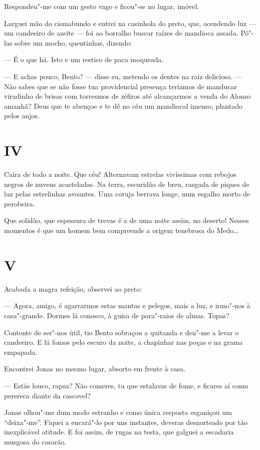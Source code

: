 Respondeu"-me com um gesto vago e ficou"-se no lugar, imóvel.

Larguei mão do cismabundo e entrei na casinhola do preto, que, acendendo
luz --- um candeeiro de azeite --- foi ao borralho buscar raízes de
mandioca assada. Pô"-las sobre um mocho, quentinhas, dizendo:

--- É o que há. Isto e um restico de paca moqueada.

--- E achas pouco, Bento? --- disse eu, metendo os dentes na raiz
deliciosa. --- Não sabes que se não fosse tua providencial presença
teríamos de manducar viradinho de brisas com torresmos de zéfiros até
alcançarmos a venda do Alonso amanhã? Deus que te abençoe e te dê no céu
um mandiocal imenso, plantado pelos anjos.

\section*{IV}

Caíra de todo a noite. Que céu! Alternavam estrelas vivíssimas com
rebojos negros de nuvens acasteladas. Na terra, escuridão de breu,
rasgada de piques de luz pelas estrelinhas avoantes. Uma coruja berrava
longe, num esgalho morto de perobeira.

Que solidão, que espessura de trevas é a de uma noite assim, no deserto!
Nesses momentos é que um homem bem compreende a origem tenebrosa do
Medo\ldots{}

\section*{V}

Acabada a magra refeição, observei ao preto:

--- Agora, amigo, é agarrarmos estas mantas e pelegos, mais a luz, e
irmo"-nos à casa"-grande. Dormes lá conosco, à guisa de para"-raios de
almas. Topas?

Contente de ser"-nos útil, tio Bento sobraçou a quitanda e deu"-me a levar
o candeeiro. E lá fomos pelo escuro da noite, a chapinhar nas poças e na
grama empapada.

Encontrei Jonas no mesmo lugar, absorto em frente à casa.

--- Estás louco, rapaz? Não comeres, tu que estalavas de fome, e ficares
aí como perereca diante da cascavel?

Jonas olhou"-me dum modo estranho e como única resposta esganiçou um
``deixa"-me''. Fiquei a encará"-lo por uns instantes, deveras desnorteado
por tão inexplicável atitude. E foi assim, de rugas na testa, que
galguei a escadaria musgosa do casarão.

